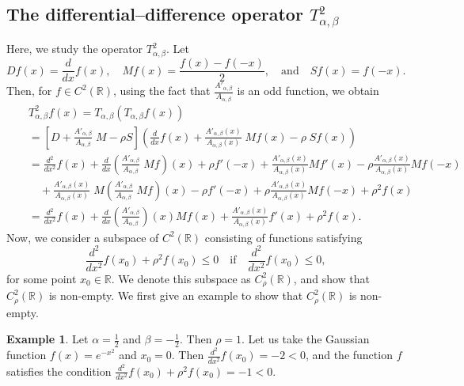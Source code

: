 \documentclass[a4paper,11pt, reqno]{amsart}
\theoremstyle{plain}
\theoremstyle{definition}
\newtheorem{example}[theorem]{Example}
\theoremstyle{remark}
\def \R{{\mathbb R}}
\def\R{\mathbb R}
\begin{document}
\subsection{The differential--difference operator $T^2_{\alpha, \beta}$}
Here, we study the operator $T^2_{\alpha, \beta}$. Let 
\[ Df(x)= \frac{d}{dx} f(x), \quad Mf(x) = \frac{f(x)-f(-x)}{2}, \quad \text{and} \quad Sf(x)=f(-x). \]
Then, for $f \in C^2(\R)$, using the fact that $\frac{A'_{\alpha, \beta} }{A_{\alpha, \beta} }$ is an odd function, we obtain
\begin{eqnarray}\label{eq05}
&& T^2_{\alpha, \beta} f(x)
=  T_{\alpha, \beta} \left( T_{\alpha, \beta} f(x) \right)  \nonumber \\ 
&& = \left[ D + \frac{A'_{\alpha, \beta} }{A_{\alpha, \beta} }\;  M  - \rho S \right] \left( \frac{d}{dx} f(x)+ \frac{A'_{\alpha, \beta} (x)}{A_{\alpha, \beta} (x)} \; Mf(x) - \rho \;Sf(x) \right) \nonumber \\ 
&& = \frac{d^2}{dx^2} f(x) + \frac{d}{dx} \left( \frac{A'_{\alpha, \beta}}{A_{\alpha, \beta} } \; Mf \right) (x) + \rho f'(-x) + \frac{A'_{\alpha, \beta} (x)}{A_{\alpha, \beta} (x)} Mf'(x) - \rho \frac{A'_{\alpha, \beta} (x)}{A_{\alpha, \beta} (x)} M f(-x) \nonumber \\ 
&& \quad  + \frac{A'_{\alpha, \beta} (x)}{A_{\alpha, \beta} (x)} \; M  \left( \frac{A'_{\alpha, \beta} }{A_{\alpha, \beta} } \; Mf \right) (x)  - \rho  f'(-x) + \rho \frac{A'_{\alpha, \beta} (x)}{A_{\alpha, \beta} (x)} Mf(-x) + \rho^2 f(x) \nonumber \\ 
&& = \frac{d^2}{dx^2} f(x) + \frac{d}{dx} \left( \frac{A'_{\alpha, \beta} }{A_{\alpha, \beta} } \right) (x) Mf(x) + \frac{A'_{\alpha, \beta} (x)}{A_{\alpha, \beta} (x)} f'(x) + \rho^2 f(x).
\end{eqnarray}
Now, we consider a subspace of $C^2(\R)$ consisting of functions satisfying 
\begin{equation}\label{eq9}
\frac{d^2}{dx^2} f(x_0) + \rho^2 f(x_0) \leq 0 \quad \text{if} \quad \frac{d^2}{dx^2} f(x_0) \leq 0,
\end{equation}
for some point $x_0 \in \R$. We denote this subspace as $C^2_\rho (\R)$, and show that $C^2_\rho (\R)$ is non-empty. We first give an example to show that $C^2_\rho (\R)$ is non-empty. 
\begin{example}
Let $\alpha=\frac{1}{2}$ and $\beta=-\frac{1}{2}$. Then $\rho=1$. Let us take the Gaussian function $f(x)=e^{-x^2}$ and $x_0=0$. Then $\frac{d^2}{dx^2} f(x_0)=-2 <0$, and the function $f$ satisfies the condition $\frac{d^2}{dx^2} f(x_0) + \rho^2 f(x_0)=-1 < 0$.
\end{example}
\end{document}
